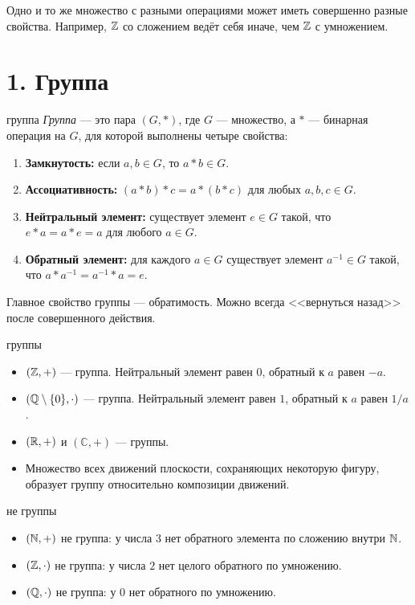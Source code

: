 \begin{remarkbox}{}
Одно и то же множество с разными операциями может иметь совершенно разные свойства. Например, $\mathbb{Z}$ со сложением ведёт себя иначе, чем $\mathbb{Z}$ с умножением.
\end{remarkbox}

\section*{1. Группа}

\begin{defbox}{группа}
\emph{Группа} --- это пара $(G,*)$, где $G$ --- множество, а $*$ --- бинарная операция на $G$, для которой выполнены четыре свойства:
\begin{enumerate}
    \item[0.] \textbf{Замкнутость:} если $a,b\in G$, то $a*b\in G$.
    \item \textbf{Ассоциативность:} $(a*b)*c=a*(b*c)$ для любых $a,b,c\in G$.
    \item \textbf{Нейтральный элемент:} существует элемент $e\in G$ такой, что $e*a=a*e=a$ для любого $a\in G$.
    \item \textbf{Обратный элемент:} для каждого $a\in G$ существует элемент $a^{-1}\in G$ такой, что $a*a^{-1}=a^{-1}*a=e$.
\end{enumerate}
\end{defbox}

\begin{remarkbox}
Главное свойство группы --- обратимость. Можно всегда <<вернуться назад>> после совершенного действия.
\end{remarkbox}

\begin{examplebox}{группы}
\begin{itemize}
    \item $(\mathbb{Z},+)$ --- группа. Нейтральный элемент равен $0$, обратный к $a$ равен $-a$.
    \item $(\mathbb{Q}\setminus\{0\},\cdot)$ --- группа. Нейтральный элемент равен $1$, обратный к $a$ равен $1/a$.
    \item $(\mathbb{R},+)$ и $(\mathbb{C},+)$ --- группы.
    \item Множество всех движений плоскости, сохраняющих некоторую фигуру, образует группу относительно композиции движений.
\end{itemize}
\end{examplebox}

\begin{warningbox}{не группы}
\begin{itemize}
    \item $(\mathbb{N},+)$ не группа: у числа $3$ нет обратного элемента по сложению внутри $\mathbb{N}$.
    \item $(\mathbb{Z},\cdot)$ не группа: у числа $2$ нет целого обратного по умножению.
    \item $(\mathbb{Q},\cdot)$ не группа: у $0$ нет обратного по умножению.
\end{itemize}
\end{warningbox}

